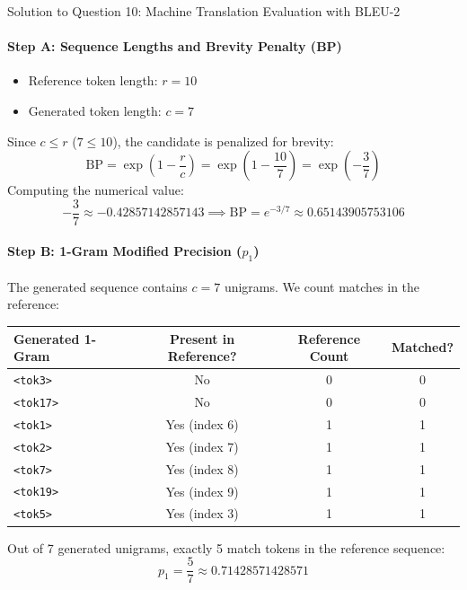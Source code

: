 \documentclass[11pt,a4paper]{article}
\begin{document}
\begin{solutionbox}{Solution to Question 10: Machine Translation Evaluation with BLEU-2}
\paragraph{Step A: Sequence Lengths and Brevity Penalty (BP)}
\begin{itemize}[noitemsep]
    \item Reference token length: $r = 10$
    \item Generated token length: $c = 7$
\end{itemize}
Since $c \le r$ ($7 \le 10$), the candidate is penalized for brevity:
\begin{equation*}
\text{BP} = \exp\left( 1 - \frac{r}{c} \right) = \exp\left( 1 - \frac{10}{7} \right) = \exp\left( -\frac{3}{7} \right)
\end{equation*}
Computing the numerical value:
\begin{equation*}
-\frac{3}{7} \approx -0.42857142857143 \implies \text{BP} = e^{-3/7} \approx \mathbf{0.65143905753106}
\end{equation*}

\paragraph{Step B: 1-Gram Modified Precision ($p_1$)}
The generated sequence contains $c = 7$ unigrams. We count matches in the reference:
\begin{center}
\begin{tabular}{lccc}
\toprule
\textbf{Generated 1-Gram} & \textbf{Present in Reference?} & \textbf{Reference Count} & \textbf{Matched?} \\
\midrule
\texttt{<tok3>} & No & 0 & 0 \\
\texttt{<tok17>} & No & 0 & 0 \\
\texttt{<tok1>} & Yes (index 6) & 1 & 1 \\
\texttt{<tok2>} & Yes (index 7) & 1 & 1 \\
\texttt{<tok7>} & Yes (index 8) & 1 & 1 \\
\texttt{<tok19>} & Yes (index 9) & 1 & 1 \\
\texttt{<tok5>} & Yes (index 3) & 1 & 1 \\
\bottomrule
\end{tabular}
\end{center}
Out of 7 generated unigrams, exactly 5 match tokens in the reference sequence:
\begin{equation*}
p_1 = \frac{5}{7} \approx \mathbf{0.71428571428571}
\end{equation*}


\end{solutionbox}
\end{document}
